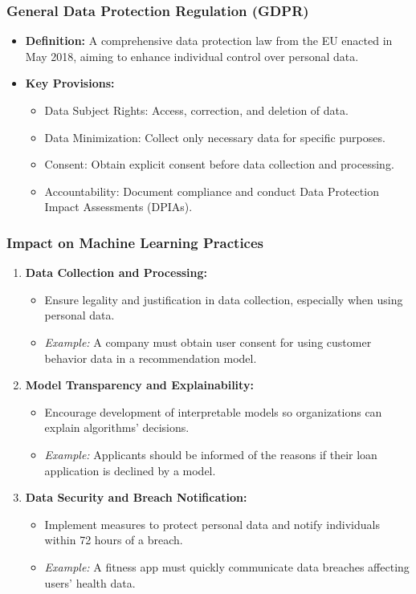 \documentclass[aspectratio=169]{beamer}
\begin{document}
\begin{frame}[fragile]
    \frametitle{General Data Protection Regulation (GDPR)}
    \begin{itemize}
        \item \textbf{Definition:} A comprehensive data protection law from the EU enacted in May 2018, aiming to enhance individual control over personal data.
        \item \textbf{Key Provisions:}
        \begin{itemize}
            \item Data Subject Rights: Access, correction, and deletion of data.
            \item Data Minimization: Collect only necessary data for specific purposes.
            \item Consent: Obtain explicit consent before data collection and processing.
            \item Accountability: Document compliance and conduct Data Protection Impact Assessments (DPIAs).
        \end{itemize}
    \end{itemize}
\end{frame}

\begin{frame}[fragile]
    \frametitle{Impact on Machine Learning Practices}
    \begin{enumerate}
        \item \textbf{Data Collection and Processing:}
        \begin{itemize}
            \item Ensure legality and justification in data collection, especially when using personal data.
            \item \textit{Example:} A company must obtain user consent for using customer behavior data in a recommendation model.
        \end{itemize}
        
        \item \textbf{Model Transparency and Explainability:}
        \begin{itemize}
            \item Encourage development of interpretable models so organizations can explain algorithms' decisions.
            \item \textit{Example:} Applicants should be informed of the reasons if their loan application is declined by a model.
        \end{itemize}
        
        \item \textbf{Data Security and Breach Notification:}
        \begin{itemize}
            \item Implement measures to protect personal data and notify individuals within 72 hours of a breach.
            \item \textit{Example:} A fitness app must quickly communicate data breaches affecting users' health data.
        \end{itemize}
    \end{enumerate}
\end{frame}
\end{document}
